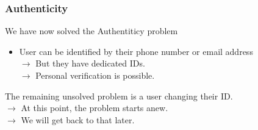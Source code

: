 \documentclass[
	aspectratio=169,
	xetex,
]{beamer}
\newcounter{i}
\begin{document}
\begin{frame}
	\frametitle{Authenticity}
	We have now solved the Authentiticy problem
	\begin{itemize}
		\item User can be identified by their phone number or email address\\
			\quad\alert{$\rightarrow$} But they have dedicated IDs.\\
			\quad\alert{$\rightarrow$} Personal verification is possible.
	\end{itemize}
	\vspace{2em}
	The remaining unsolved problem is a user changing their ID.\\
			\quad\alert{$\rightarrow$} At this point, the problem starts anew.\\
			\quad\alert{$\rightarrow$} We will get back to that later.

\end{frame}
\end{document}
